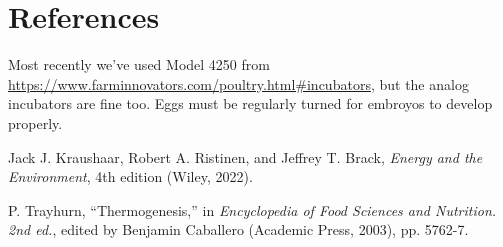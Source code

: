 \documentclass[prb,preprint]{revtex4-2}
\begin{document}
%

\section*{References}
\begin{thebibliography}{99}

Most recently we've used Model 4250 from \url{https://www.farminnovators.com/poultry.html#incubators}, but the analog incubators are fine too.  Eggs must be regularly turned for embroyos to develop properly.  



Jack J. Kraushaar, Robert A. Ristinen, and Jeffrey T. Brack,
\textit{Energy and the Environment}, 
4th edition
(Wiley, 2022).

P. Trayhurn,
``Thermogenesis,''
in \textit{Encyclopedia of Food Sciences and Nutrition. 2nd ed.},
edited by Benjamin Caballero 
(Academic Press, 2003), pp. 5762-7.


\end{thebibliography}
\end{document}
